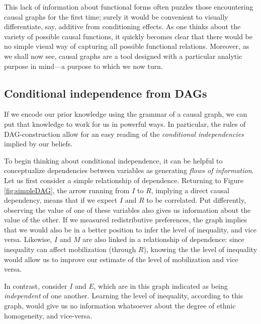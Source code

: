 \documentclass[12pt,]{book}
\begin{document}
This lack of information about functional forms often puzzles those encountering causal graphs for the first time; surely it would be convenient to visually differentiate, say, additive from conditioning effects. As one thinks about the variety of possible causal functions, it quickly becomes clear that there would be no simple visual way of capturing all possible functional relations. Moreover, as we shall now see, causal graphs are a tool designed with a particular analytic purpose in mind---a purpose to which we now turn.

\hypertarget{conditional-independence-from-dags}{%
\subsection{Conditional independence from DAGs}\label{conditional-independence-from-dags}}

If we encode our prior knowledge using the grammar of a causal graph, we can put that knowledge to work for us in powerful ways. In particular, the rules of DAG-construction allow for an easy reading of the \emph{conditional independencies} implied by our beliefs.

To begin thinking about conditional independence, it can be helpful to conceptualize dependencies between variables as generating \emph{flows of information}. Let us first consider a simple relationship of dependence. Returning to Figure \ref{fig:simpleDAG}, the arrow running from \(I\) to \(R\), implying a direct causal dependency, means that if we expect \(I\) and \(R\) to be correlated. Put differently, observing the value of one of these variables also gives us information about the value of the other. If we measured redistributive preferences, the graph implies that we would also be in a better position to infer the level of inequality, and vice versa. Likewise, \(I\) and \(M\) are also linked in a relationship of dependence: since inequality can affect mobilization (through \(R\)), knowing the the level of inequality would allow us to improve our estimate of the level of mobilization and vice versa.

In contrast, consider \(I\) and \(E\), which are in this graph indicated as being \emph{independent} of one another. Learning the level of inequality, according to this graph, would give us no information whatsoever about the degree of ethnic homogeneity, and vice-versa.
\end{document}
